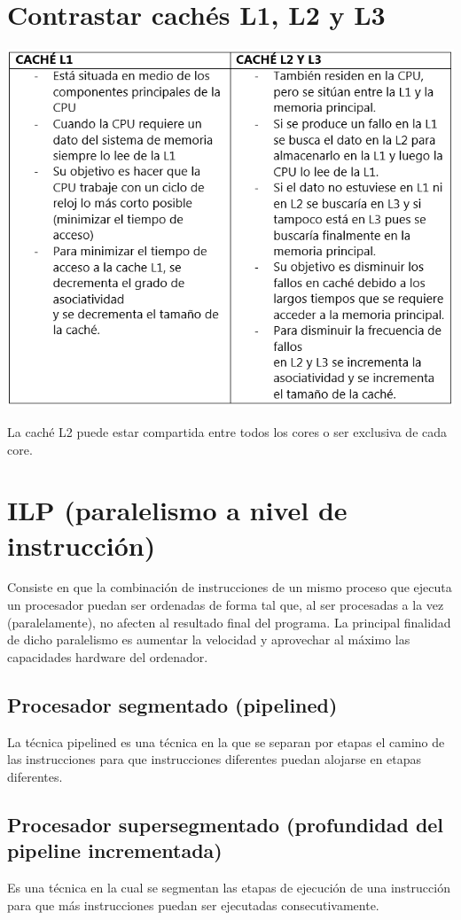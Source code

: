 \documentclass[11pt,letterpaper]{article}
\begin{document}
\section{Contrastar cachés L1, L2 y L3}
\begin{center}
	\includegraphics[scale=0.9]{Caches.png}
\end{center}
La caché L2 puede estar compartida entre todos los cores o ser exclusiva de cada core.

\section{ILP (paralelismo a nivel de instrucción)}
\noindent
Consiste en que la combinación de instrucciones de un mismo proceso que ejecuta un procesador puedan ser ordenadas de forma tal que, al ser procesadas a la vez (paralelamente), no afecten al resultado final del programa. La principal finalidad de dicho paralelismo es aumentar la velocidad y aprovechar al máximo las capacidades hardware del ordenador.
\subsection{Procesador segmentado (pipelined)}
\noindent
La técnica pipelined es una técnica en la que se separan por etapas el camino de las instrucciones para que instrucciones diferentes puedan alojarse en etapas diferentes.
\subsection{Procesador supersegmentado (profundidad del pipeline incrementada)}
\noindent
Es una técnica en la cual se segmentan las etapas de ejecución de una instrucción para que más instrucciones puedan ser ejecutadas consecutivamente.
\end{document}

